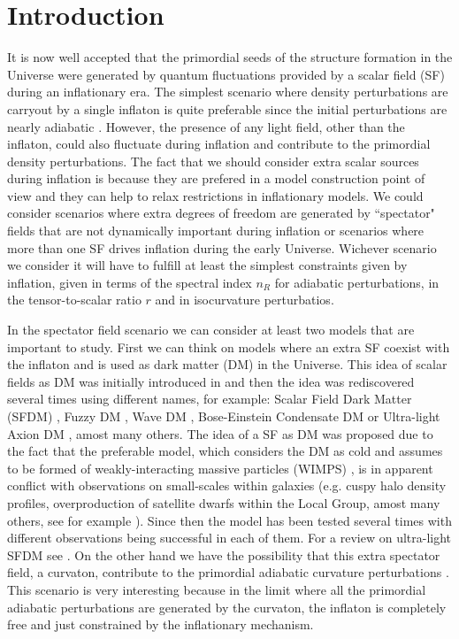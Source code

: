 \documentclass[amssymb,twocolumn,prd,nofootinbib,showpacs]{revtex4-1}
\begin{document}
\section{Introduction}
\label{introduction}
It is now well accepted that the primordial seeds of the structure formation in the Universe were generated by quantum fluctuations provided by a scalar field (SF) during an inflationary era. The simplest scenario where density perturbations are carryout by a single inflaton is quite preferable since the initial perturbations are nearly adiabatic \cite{const1,const2,planck}. However, the presence of any light field, other than the inflaton, could also fluctuate during inflation and contribute to the primordial density perturbations. The fact that we should consider extra scalar sources during inflation is because they are prefered in a model construction point of view and they can help to relax restrictions in inflationary models. We could consider scenarios where extra degrees of freedom are generated by ``spectator" fields that are not dynamically important during inflation or scenarios where more than one SF drives inflation during the early Universe. Wichever scenario we consider it will have to fulfill at least the simplest constraints given by inflation, given in terms of the spectral index $n_R$ for adiabatic perturbations, in the tensor-to-scalar ratio $r$ and in isocurvature perturbatios. 

In the spectator field scenario we can consider at least two models that are important to study. First we can think on models where an extra SF coexist with the inflaton and is used as dark matter (DM) in the Universe. This idea of scalar fields as DM was initially introduced in \cite{SF1} and then the idea was rediscovered several times using different names, for example: Scalar Field Dark Matter  (SFDM)  \cite{SF2},  Fuzzy  DM  \cite{SF3}, Wave DM \cite{SF4,SF5}, Bose-Einstein
Condensate DM \cite{SF6} or Ultra-light Axion DM
\cite{SF7,SF8}, amost many others. The idea of a SF as DM was proposed due to the fact that the preferable model, which considers the DM as cold and assumes to be formed of weakly-interacting massive particles (WIMPS) \cite{LCDM1,LCDM2}, is in apparent conflict with observations on small-scales within galaxies (e.g. cuspy halo density profiles, overproduction of satellite dwarfs within the Local Group, amost many others, see for example \cite{problem1,problem2,problem3,problem4,problem5}). Since then the model has been tested several times with different observations being successful in each of them. For a review on ultra-light SFDM see \cite{SF9,SF10,SF11,SF12}. On the other hand we have the possibility that this extra spectator field, a curvaton, contribute to the primordial adiabatic curvature perturbations \cite{curv1,curv2,curv3}. This scenario is very interesting because in the limit where all the primordial adiabatic perturbations are generated by the curvaton, the inflaton is completely free and just constrained by the inflationary mechanism.
\end{document}
